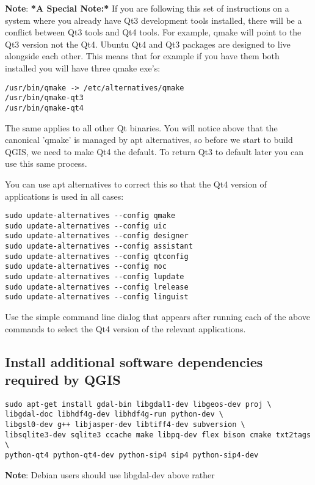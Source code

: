 \textbf{Note}:   \textbf{*A Special Note:*} If you are following this set of instructions on
a system where you already have Qt3 development tools installed, there will
be a conflict between Qt3 tools and Qt4 tools. For example, qmake will
point to the Qt3 version not the Qt4. Ubuntu Qt4 and Qt3 packages are
designed to live alongside each other. This means that for example if you
have them both installed you will have three qmake exe's:

\begin{verbatim}
/usr/bin/qmake -> /etc/alternatives/qmake 
/usr/bin/qmake-qt3
/usr/bin/qmake-qt4 
\end{verbatim}

The same applies to all other Qt binaries. You will notice above that the
canonical 'qmake' is managed by apt alternatives, so before we start to
build QGIS, we need to make Qt4 the default. To return Qt3 to default later
you can use this same process.

You can use apt alternatives to correct this so that the Qt4 version of
applications is used in all cases:

\begin{verbatim}
sudo update-alternatives --config qmake
sudo update-alternatives --config uic 
sudo update-alternatives --config designer 
sudo update-alternatives --config assistant 
sudo update-alternatives --config qtconfig 
sudo update-alternatives --config moc 
sudo update-alternatives --config lupdate 
sudo update-alternatives --config lrelease 
sudo update-alternatives --config linguist 
\end{verbatim}

Use the simple command line dialog that appears after running each of the
above commands to select the Qt4 version of the relevant applications.

\subsection{Install additional software dependencies required by QGIS}
\begin{verbatim}
sudo apt-get install gdal-bin libgdal1-dev libgeos-dev proj \
libgdal-doc libhdf4g-dev libhdf4g-run python-dev \
libgsl0-dev g++ libjasper-dev libtiff4-dev subversion \
libsqlite3-dev sqlite3 ccache make libpq-dev flex bison cmake txt2tags \
python-qt4 python-qt4-dev python-sip4 sip4 python-sip4-dev
\end{verbatim}

\textbf{Note}:   Debian users should use libgdal-dev above rather

